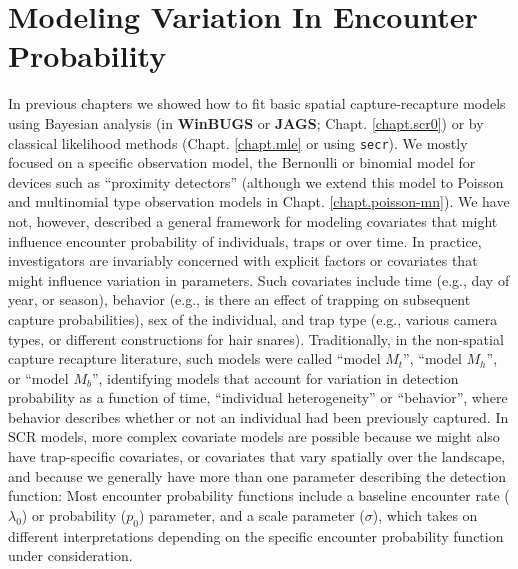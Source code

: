 \chapter{
Modeling Variation In Encounter Probability
}
\label{chapt.covariates}

\vspace{.3in}



In previous chapters we showed how to fit basic spatial
capture-recapture models using Bayesian analysis (in {\bf WinBUGS} or
{\bf JAGS}; Chapt. \ref{chapt.scr0}) or by classical likelihood
methods (Chapt. \ref{chapt.mle} or using \mbox{\tt secr}). We mostly
focused on a specific observation model, the Bernoulli or binomial
model for devices such as ``proximity detectors'' (although we extend
this model to Poisson and multinomial type observation models in
Chapt. \ref{chapt.poisson-mn}).  We have not, however, described a
general framework for modeling covariates that might influence
encounter probability of individuals, traps or over time.  In
practice, investigators are invariably concerned with explicit factors
or covariates that might influence variation in parameters. Such
covariates include time (e.g., day of year, or season), behavior
(e.g., is there an effect of trapping on subsequent capture
probabilities), sex of the individual, and trap type (e.g., various
camera types, or different constructions for hair
snares). Traditionally, in the non-spatial capture recapture
literature, such models were called ``model $M_t$'', ``model $M_h$'',
or ``model $M_b$'', identifying models that account for variation in
detection probability as a function of time, ``individual
heterogeneity'' or ``behavior'', where behavior describes whether or
not an individual had been previously captured. In SCR models, more
complex covariate models are possible because we might also have
trap-specific covariates, or covariates that vary spatially over the
landscape, and because we generally have more than one parameter
describing the detection function: Most encounter probability
functions include a baseline encounter rate ($\lambda_0$) or
probability ($p_0$) parameter, and a scale parameter ($\sigma$), which
takes on different interpretations depending on the specific encounter
probability function under consideration.

